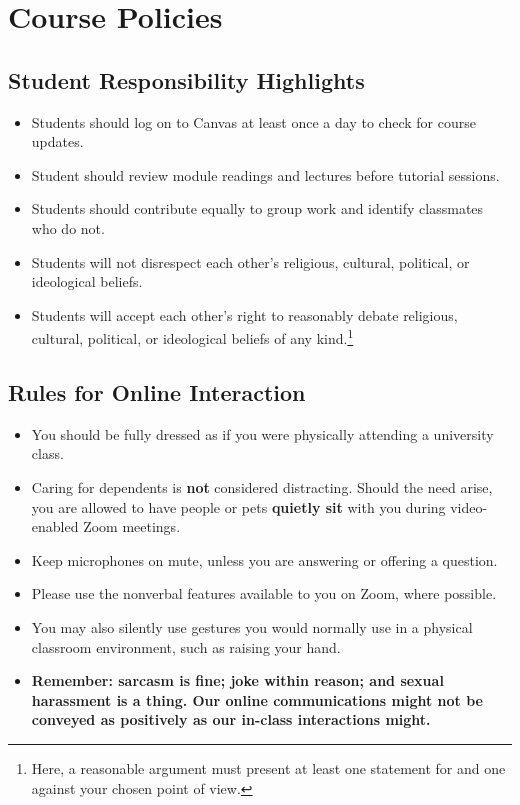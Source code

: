 \documentclass[10pt,]{article}
\providecommand{\tightlist}{%
  \setlength{\itemsep}{0pt}\setlength{\parskip}{0pt}}
\begin{document}
\newpage

\hypertarget{course-policies}{%
\section{Course Policies}\label{course-policies}}

\hypertarget{student-responsibility-highlights}{%
\subsection{Student Responsibility
Highlights}\label{student-responsibility-highlights}}

\begin{itemize}
\tightlist
\item
  Students should log on to Canvas at least once a day to check for
  course updates.
\item
  Student should review module readings and lectures before tutorial
  sessions.
\item
  Students should contribute equally to group work and identify
  classmates who do not.
\item
  Students will not disrespect each other's religious, cultural,
  political, or ideological beliefs.
\item
  Students will accept each other's right to reasonably debate
  religious, cultural, political, or ideological beliefs of any
  kind.\footnote{Here, a reasonable argument must present at least one
    statement for and one against your chosen point of view.}
\end{itemize}

\hypertarget{rules-for-online-interaction}{%
\subsection{Rules for Online
Interaction}\label{rules-for-online-interaction}}

\begin{itemize}
\tightlist
\item
  You should be fully dressed as if you were physically attending a
  university class.
\item
  Caring for dependents is \textbf{not} considered distracting. Should
  the need arise, you are allowed to have people or pets \textbf{quietly
  sit} with you during video-enabled Zoom meetings.
\item
  Keep microphones on mute, unless you are answering or offering a
  question.
\item
  Please use the nonverbal features available to you on Zoom, where
  possible.
\item
  You may also silently use gestures you would normally use in a
  physical classroom environment, such as raising your hand.
\item
  \textbf{Remember: sarcasm is fine; joke within reason; and sexual
  harassment is a thing. Our online communications might not be conveyed
  as positively as our in-class interactions might.}
\end{itemize}
\end{document}
